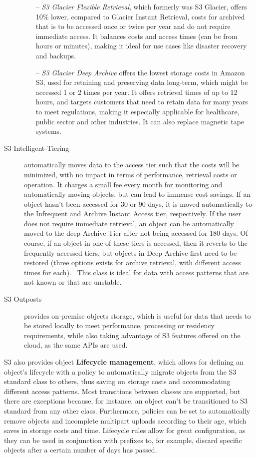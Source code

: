 \begin{description}
\begin{itemize}
        \item[--] \textit{S3 Glacier Flexible Retrieval}, which formerly was S3 Glacier, offers 10\% lower, compared to Glacier Instant Retrieval, costs for archived that is to be accessed once or twice per year and do not require immediate access. It balances costs and access times (can be from hours or minutes), making it ideal for use cases like disaster recovery and backups.

        \item[--] \textit{S3 Glacier Deep Archive} offers the lowest storage costs in Amazon S3, used for retaining and preserving data long-term, which might be accessed 1 or 2 times per year. It offers retrieval times of up to 12 hours, and targets customers that need to retain data for many years to meet regulations, making it especially applicable for healthcare, public sector and other industries. It can also replace magnetic tape systems.
    \end{itemize}

    \item[S3 Intelligent-Tiering] automatically moves data to the access tier such that the costs will be minimized, with no impact in terms of performance, retrieval costs or operation. It charges a small fee every month for monitoring and automatically moving objects, but can lead to immense cost savings. If an object hasn't been accessed for 30 or 90 days, it is moved automatically to the Infrequent and Archive Instant Access tier, respectively. If the user does not require immediate retrieval, an object can be automatically moved to the deep Archive Tier after not being accessed for 180 days. Of course, if an object in one of these tiers is accessed, then it reverts to the frequently accessed tiers, but objects in Deep Archive first need to be restored (three options exists for archive retrieval, with different access times for each).~\cite{archiverestore} This class is ideal for data with access patterns that are not known or that are unstable.

    \item[S3 Outposts] provides on-premise objects storage, which is useful for data that needs to be stored locally to meet performance, processing or residency requirements, while also taking advantage of S3 features offered on the cloud, as the same APIs are used.
\end{description}

S3 also provides object\textbf{ Lifecycle management}, which allows for defining an object's lifecycle with a policy to automatically migrate objects from the S3 standard class to others, thus saving on storage costs and accommodating different access patterns. Most transitions between classes are supported, but there are exceptions because, for instance, an object can't be transitioned to S3 standard from any other class. Furthermore,  policies can be set to automatically remove objects and incomplete multipart uploads according to their age, which saves in storage costs and time. Lifecycle rules allow for great configuration, as they can be used in conjunction with prefixes to, for example, discard specific objects after a certain number of days has passed.~\cite{s3lifecycle}

